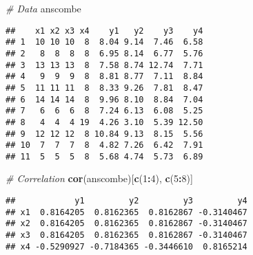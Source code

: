 \documentclass[
]{book}
\newenvironment{Shaded}{\begin{snugshade}}{\end{snugshade}}
\newcommand{\CommentTok}[1]{\textcolor[rgb]{0.56,0.35,0.01}{\textit{#1}}}
\newcommand{\DecValTok}[1]{\textcolor[rgb]{0.00,0.00,0.81}{#1}}
\newcommand{\KeywordTok}[1]{\textcolor[rgb]{0.13,0.29,0.53}{\textbf{#1}}}
\newcommand{\NormalTok}[1]{#1}
\newcommand{\OperatorTok}[1]{\textcolor[rgb]{0.81,0.36,0.00}{\textbf{#1}}}
\begin{document}
\begin{Shaded}
\begin{Highlighting}[]
\CommentTok{\# Data}
\NormalTok{anscombe}
\end{Highlighting}
\end{Shaded}

\begin{verbatim}
##    x1 x2 x3 x4    y1   y2    y3    y4
## 1  10 10 10  8  8.04 9.14  7.46  6.58
## 2   8  8  8  8  6.95 8.14  6.77  5.76
## 3  13 13 13  8  7.58 8.74 12.74  7.71
## 4   9  9  9  8  8.81 8.77  7.11  8.84
## 5  11 11 11  8  8.33 9.26  7.81  8.47
## 6  14 14 14  8  9.96 8.10  8.84  7.04
## 7   6  6  6  8  7.24 6.13  6.08  5.25
## 8   4  4  4 19  4.26 3.10  5.39 12.50
## 9  12 12 12  8 10.84 9.13  8.15  5.56
## 10  7  7  7  8  4.82 7.26  6.42  7.91
## 11  5  5  5  8  5.68 4.74  5.73  6.89
\end{verbatim}

\begin{Shaded}
\begin{Highlighting}[]
\CommentTok{\# Correlation}
\KeywordTok{cor}\NormalTok{(anscombe)[}\KeywordTok{c}\NormalTok{(}\DecValTok{1}\OperatorTok{:}\DecValTok{4}\NormalTok{), }\KeywordTok{c}\NormalTok{(}\DecValTok{5}\OperatorTok{:}\DecValTok{8}\NormalTok{)]}
\end{Highlighting}
\end{Shaded}

\begin{verbatim}
##            y1         y2         y3         y4
## x1  0.8164205  0.8162365  0.8162867 -0.3140467
## x2  0.8164205  0.8162365  0.8162867 -0.3140467
## x3  0.8164205  0.8162365  0.8162867 -0.3140467
## x4 -0.5290927 -0.7184365 -0.3446610  0.8165214
\end{verbatim}
\end{document}
